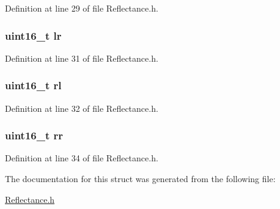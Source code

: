 Definition at line 29 of file Reflectance.\+h.

\subsubsection[{\texorpdfstring{lr}{lr}}]{\setlength{\rightskip}{0pt plus 5cm}uint16\+\_\+t lr}\hypertarget{structdigital__sensor__value___af650f74b54fbe6d55c96161d2a7098ea}{}\label{structdigital__sensor__value___af650f74b54fbe6d55c96161d2a7098ea}


Definition at line 31 of file Reflectance.\+h.

\subsubsection[{\texorpdfstring{rl}{rl}}]{\setlength{\rightskip}{0pt plus 5cm}uint16\+\_\+t rl}\hypertarget{structdigital__sensor__value___a55f8b53aee5b41e8af88a816fab2b70b}{}\label{structdigital__sensor__value___a55f8b53aee5b41e8af88a816fab2b70b}


Definition at line 32 of file Reflectance.\+h.

\subsubsection[{\texorpdfstring{rr}{rr}}]{\setlength{\rightskip}{0pt plus 5cm}uint16\+\_\+t rr}\hypertarget{structdigital__sensor__value___a6988d1a89f109b3f8d0e06547a5362f6}{}\label{structdigital__sensor__value___a6988d1a89f109b3f8d0e06547a5362f6}


Definition at line 34 of file Reflectance.\+h.



The documentation for this struct was generated from the following file\+:\begin{DoxyCompactItemize}
\item 
\hyperlink{_reflectance_8h}{Reflectance.\+h}\end{DoxyCompactItemize}
